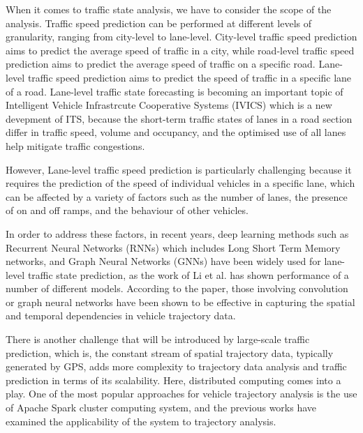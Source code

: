 \documentclass{article}
\begin{document}
When it comes to traffic state analysis, we have to consider the scope of the analysis. Traffic speed prediction can be performed at different levels of granularity, ranging from city-level to lane-level. City-level traffic speed prediction aims to predict the average speed of traffic in a city, while road-level traffic speed prediction aims to predict the average speed of traffic on a specific road. Lane-level traffic speed prediction aims to predict the speed of traffic in a specific lane of a road. Lane-level traffic state forecasting is becoming an important topic of Intelligent Vehicle Infrastrcute Cooperative Systems (IVICS) which is a new devepment of ITS, because the short-term traffic states of lanes in a road section differ in traffic speed, volume and occupancy\cite{GU20191}, and the optimised use of all lanes help mitigate traffic congestions. 

However, Lane-level traffic speed prediction is particularly challenging because it requires the prediction of the speed of individual vehicles in a specific lane, which can be affected by a variety of factors such as the number of lanes, the presence of on and off ramps, and the behaviour of other vehicles.

In order to address these factors, in recent years, deep learning methods such as Recurrent Neural Networks (RNNs) which includes Long Short Term Memory networks, and Graph Neural Networks (GNNs) have been widely used for lane-level traffic state prediction, as the work of Li et al.\cite{li2024unifyinglaneleveltrafficprediction} has shown performance of a number of different models. According to the paper, those involving convolution or graph neural networks have been shown to be effective in capturing the spatial and temporal dependencies in vehicle trajectory data.

There is another challenge that will be introduced by large-scale traffic prediction, which is, the constant stream of spatial trajectory data, typically generated by GPS, adds more complexity to trajectory data analysis and traffic prediction in terms of its scalability. Here, distributed computing comes into a play. One of the most popular approaches for vehicle trajectory analysis is the use of Apache Spark cluster computing system, and the previous works\cite{9077707}\cite{Sigurdsson2018RoadTC} have examined the applicability of the system to trajectory analysis.
\end{document}
